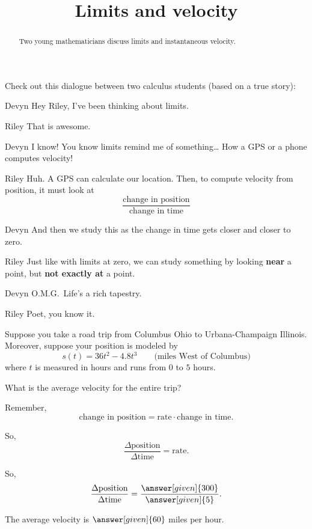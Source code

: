 \documentclass{ximera}
\title[Break-Ground:]{Limits and velocity}
\begin{document}
\begin{abstract}
Two young mathematicians discuss limits and instantaneous velocity.
\end{abstract}
\maketitle

Check out this dialogue between two calculus students (based on a true
story):

\begin{dialogue}
\item[Devyn] Hey Riley, I've been thinking about limits.
\item[Riley] That is awesome.
\item[Devyn] I know! You know limits remind me of something\dots
  How a GPS or a phone computes velocity!
\item[Riley] Huh.  A GPS can calculate our location.   Then, to compute velocity 
from position, it must look at
  \[
  \frac{\text{change in position}}{\text{change in time}}
  \]
\item[Devyn] And then we study this as the change in time gets closer
  and closer to zero.
\item[Riley] Just like with limits at zero, we can study something by
  looking \textbf{near} a point, but \textbf{not exactly at} a point.
\item[Devyn] O.M.G.\ Life's a rich tapestry.
\item[Riley] Poet, you know it.
\end{dialogue}



Suppose you take a road trip from Columbus Ohio to Urbana-Champaign
Illinois. Moreover, suppose your position is modeled by
\[
s(t) = 36t^2 -4.8t^3 \qquad\text{(miles West of Columbus)} %
\]
where $t$ is measured in hours and runs from $0$ to $5$ hours. 

\begin{problem}
  What is the average velocity for the entire trip?
  \begin{hint}
    Remember, 
    \[
    \text{change in position} = \text{rate}\cdot\text{change in time}.
    \]
  \end{hint}
  \begin{hint}
    So, 
    \[
    \frac{\Delta\text{position}}{\Delta\text{time}} = \text{rate}.
    \]
  \end{hint}
  \begin{hint}
    So, 
    \[
    \frac{\Delta\text{position}}{\Delta\text{time}} = \frac{\answer[given]{300}}{\answer[given]{5}}.
    \]
  \end{hint}
  \begin{prompt}
    The average velocity is $\answer[given]{60}$ miles per hour.
  \end{prompt}
\end{problem}
\end{document}
